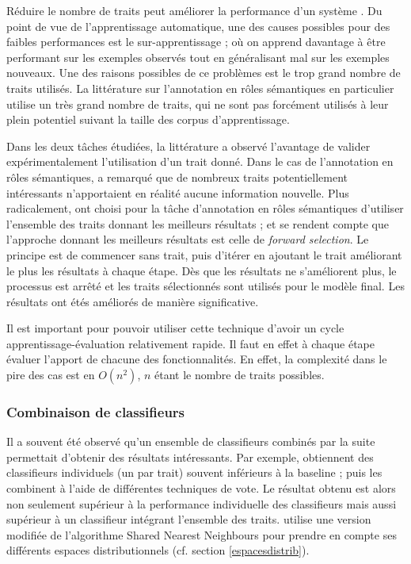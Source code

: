 
Réduire le nombre de traits peut améliorer la performance d'un système
\cite{mihalcea2002instance,dinu2007sometimes}. Du point de vue de
l'apprentissage automatique, une des causes possibles pour des faibles
performances est le sur-apprentissage ; où on apprend davantage à être
performant sur les exemples observés tout en généralisant mal sur les exemples
nouveaux. Une des raisons possibles de ce problèmes est le trop grand nombre de
traits utilisés. La littérature sur l'annotation en rôles sémantiques en
particulier utilise un très grand nombre de traits, qui ne sont pas forcément
utilisés à leur plein potentiel suivant la taille des corpus d'apprentissage.

Dans les deux tâches étudiées, la littérature a observé l'avantage de valider
expérimentalement l'utilisation d'un trait donné. Dans le cas de l'annotation
en rôles sémantiques, \cite{xue2004calibrating} a remarqué que de nombreux
traits potentiellement intéressants n'apportaient en réalité aucune information
nouvelle. Plus radicalement, \cite{mihalcea2002instance,dinu2007sometimes} ont
choisi pour la tâche d'annotation en rôles sémantiques d'utiliser l'ensemble
des traits donnant les meilleurs résultats ; et se rendent compte que
l'approche donnant les meilleurs résultats est celle de \textit{forward
selection}. Le principe est de commencer sans trait, puis d'itérer en ajoutant
le trait améliorant le plus les résultats à chaque étape. Dès que les résultats
ne s'améliorent plus, le processus est arrêté et les traits sélectionnés sont
utilisés pour le modèle final. Les résultats ont étés améliorés de manière
significative.

Il est important pour pouvoir utiliser cette technique d'avoir un cycle
apprentissage-évaluation relativement rapide. Il faut en effet à chaque étape
évaluer l'apport de chacune des fonctionnalités. En effet, la complexité dans
le pire des cas est en $O(n^2)$, $n$ étant le nombre de traits possibles.

\subsubsection{Combinaison de classifieurs}

Il a souvent été observé qu'un ensemble de classifieurs combinés par la suite
permettait d'obtenir des résultats intéressants. Par exemple,
\cite{kohomban2005learning,dinu2007sometimes} obtiennent des classifieurs
individuels (un par trait) souvent inférieurs à la baseline ; puis les
combinent à l'aide de différentes techniques de vote. Le résultat obtenu est
alors non seulement supérieur à la performance individuelle des classifieurs
mais aussi supérieur à un classifieur intégrant l'ensemble des traits.
\cite{mouton2009induction} utilise une version modifiée de l'algorithme Shared
Nearest Neighbours pour prendre en compte ses différents espaces
distributionnels  (cf. section \ref{espacesdistrib}).

